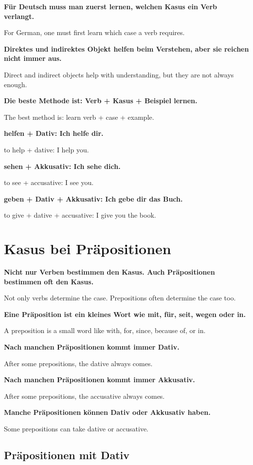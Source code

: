 \documentclass[a4paper]{article}
\newcommand{\EN}[1]{\par{\small\textcolor{TranslationGray}{#1}}\vspace{0.4em}}
\begin{document}
            \textbf{Für Deutsch muss man zuerst lernen, welchen Kasus ein Verb verlangt.}
            \EN{For German, one must first learn which case a verb requires.}
            
            \textbf{Direktes und indirektes Objekt helfen beim Verstehen, aber sie reichen nicht immer aus.}
            \EN{Direct and indirect objects help with understanding, but they are not always enough.}
            
            \textbf{Die beste Methode ist: Verb + Kasus + Beispiel lernen.}
            \EN{The best method is: learn verb + case + example.}
            
            \textbf{helfen + Dativ: Ich helfe dir.}
            \EN{to help + dative: I help you.}
            
            \textbf{sehen + Akkusativ: Ich sehe dich.}
            \EN{to see + accusative: I see you.}
            
            \textbf{geben + Dativ + Akkusativ: Ich gebe dir das Buch.}
            \EN{to give + dative + accusative: I give you the book.}
    
    
    \section{Kasus bei Präpositionen}
        
        \textbf{Nicht nur Verben bestimmen den Kasus. Auch Präpositionen bestimmen oft den Kasus.}
        \EN{Not only verbs determine the case. Prepositions often determine the case too.}
        
        \textbf{Eine Präposition ist ein kleines Wort wie mit, für, seit, wegen oder in.}
        \EN{A preposition is a small word like with, for, since, because of, or in.}
        
        \textbf{Nach manchen Präpositionen kommt immer Dativ.}
        \EN{After some prepositions, the dative always comes.}
        
        \textbf{Nach manchen Präpositionen kommt immer Akkusativ.}
        \EN{After some prepositions, the accusative always comes.}
        
        \textbf{Manche Präpositionen können Dativ oder Akkusativ haben.}
        \EN{Some prepositions can take dative or accusative.}
        
        \subsection{Präpositionen mit Dativ}
            
\end{document}
